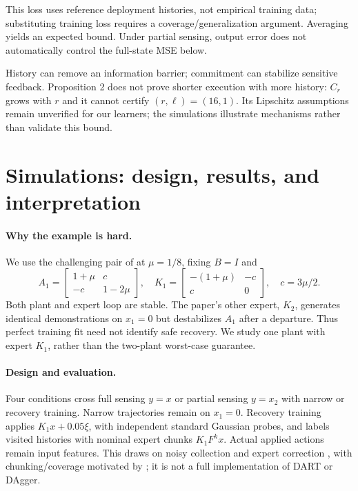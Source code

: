 \documentclass{l4dc2026}
\begin{document}
This loss uses reference deployment histories, not empirical training data; substituting training loss requires a coverage/generalization argument. Averaging yields an expected bound. Under partial sensing, output error does not automatically control the full-state MSE below.

History can remove an information barrier; commitment can stabilize sensitive feedback. Proposition 2 does not prove shorter execution with more history: $C_r$ grows with $r$ and it cannot certify $(r,\ell)=(16,1)$. Its Lipschitz assumptions remain unverified for our learners; the simulations illustrate mechanisms rather than validate this bound.

\section{Simulations: design, results, and interpretation}
\paragraph{Why the example is hard.}
We use the challenging pair of \citet[Def.~4.1]{simchowitz2025} at $\mu=1/8$, fixing $B=I$ and
\[
A_1=\begin{bmatrix}1+\mu&c\\-c&1-2\mu\end{bmatrix},\quad
K_1=\begin{bmatrix}-(1+\mu)&-c\\c&0\end{bmatrix},\quad c=3\mu/2.
\]
Both plant and expert loop are stable. The paper's other expert, $K_2$, generates identical demonstrations on $x_1=0$ but destabilizes $A_1$ after a departure. Thus perfect training fit need not identify safe recovery. We study one plant with expert $K_1$, rather than the two-plant worst-case guarantee.

\paragraph{Design and evaluation.}
Four conditions cross full sensing $y=x$ or partial sensing $y=x_2$ with narrow or recovery training. Narrow trajectories remain on $x_1=0$. Recovery training applies $K_1x+0.05\xi$, with independent standard Gaussian probes, and labels visited histories with nominal expert chunks $K_1F^kx$. Actual applied actions remain input features. This draws on noisy collection and expert correction \citep{laskey2017,ross2011}, with chunking/coverage motivated by \citet{zhang2025}; it is not a full implementation of DART or DAgger.
\end{document}
